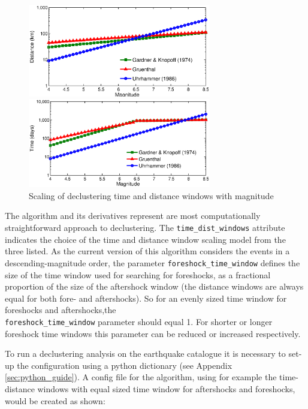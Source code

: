 \begin{figure}[htb]
  \centering
  \begin{subcaption}
      \centering
      \includegraphics[width=8cm]{./figures/declustering_distance_windows.eps}
	\end{subcaption}
  \begin{subcaption}
      \centering
      \includegraphics[width=8cm]{./figures/declustering_time_windows.eps}
	\end{subcaption}	
	\caption{Scaling of declustering time and distance windows with magnitude}
	\label{fig:declust_scaling}
\end{figure}

The \textcite{GardnerKnopoff1974} algorithm and its derivatives represent 
are most computationally straightforward approach to declustering. The \verb=time_dist_windows= attribute indicates the choice of the 
time and distance window scaling model from the three listed. As 
the current version of this algorithm considers the events in a 
descending-magnitude order, the parameter \verb=foreshock_time_window= 
defines the size of the time window used for searching for foreshocks, 
as a fractional proportion of the size of the aftershock window (the 
distance windows are always equal for both fore- and aftershocks). 
So for an evenly sized time window for foreshocks and aftershocks,the\\
\verb=foreshock_time_window= parameter should equal 1. For shorter or longer 
foreshock time windows this parameter can be reduced or increased respectively.

To run a declustering analysis on the earthquake catalogue it is necessary to set-up the configuration using a python dictionary (see Appendix \ref{sec:python_guide}). A config file for the \textcite{GardnerKnopoff1974} algorithm, using for example the \textcite{Uhrhammer1986} time-distance windows with equal sized time window for aftershocks and foreshocks, would be created as shown:

